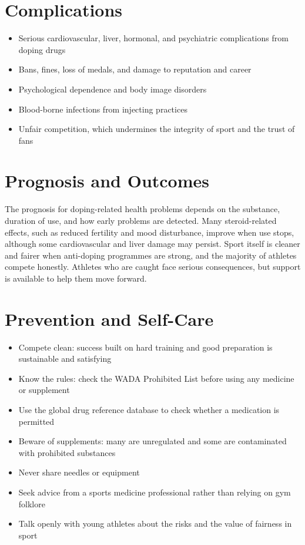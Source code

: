 \section*{Complications}
\begin{itemize}
    \item Serious cardiovascular, liver, hormonal, and psychiatric complications from doping drugs
    \item Bans, fines, loss of medals, and damage to reputation and career
    \item Psychological dependence and body image disorders
    \item Blood-borne infections from injecting practices
    \item Unfair competition, which undermines the integrity of sport and the trust of fans
\end{itemize}

\section*{Prognosis and Outcomes}
The prognosis for doping-related health problems depends on the substance, duration of use, and how early problems are detected. Many steroid-related effects, such as reduced fertility and mood disturbance, improve when use stops, although some cardiovascular and liver damage may persist. Sport itself is cleaner and fairer when anti-doping programmes are strong, and the majority of athletes compete honestly. Athletes who are caught face serious consequences, but support is available to help them move forward.

\section*{Prevention and Self-Care}
\begin{itemize}
    \item Compete clean: success built on hard training and good preparation is sustainable and satisfying
    \item Know the rules: check the WADA Prohibited List before using any medicine or supplement
    \item Use the global drug reference database to check whether a medication is permitted
    \item Beware of supplements: many are unregulated and some are contaminated with prohibited substances
    \item Never share needles or equipment
    \item Seek advice from a sports medicine professional rather than relying on gym folklore
    \item Talk openly with young athletes about the risks and the value of fairness in sport
\end{itemize}


